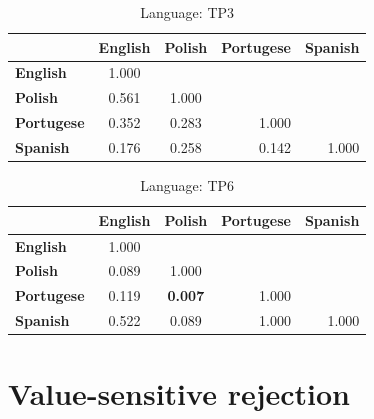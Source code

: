 \begin{table}
    \small
    \centering
    \begin{tabular}{lcccc}
        \toprule
                           & \multicolumn{1}{l}{\textbf{English}} & \multicolumn{1}{l}{\textbf{Polish}} & \textbf{Portugese}        & \textbf{Spanish}          \\
        \midrule
        \textbf{English}   & 1.000                                & \multicolumn{1}{l}{}                &                           &                           \\
        \textbf{Polish}    & 0.561                                & 1.000                               &                           &                           \\
        \textbf{Portugese} & 0.352                                & 0.283                               & \multicolumn{1}{r}{1.000} &                           \\
        \textbf{Spanish}   & 0.176                                & 0.258                               & \multicolumn{1}{r}{0.142} & \multicolumn{1}{r}{1.000} \\
        \bottomrule
    \end{tabular}
    \caption{Language: TP3}
\end{table}

\begin{table}
    \small
    \centering
    \begin{tabular}{lcccc}
        \toprule
                           & \multicolumn{1}{l}{\textbf{English}} & \multicolumn{1}{l}{\textbf{Polish}}    & \textbf{Portugese}        & \textbf{Spanish}          \\
        \midrule
        \textbf{English}   & 1.000                                & \multicolumn{1}{l}{}                   &                           &                           \\
        \textbf{Polish}    & 0.089                                & 1.000                                  &                           &                           \\
        \textbf{Portugese} & 0.119                                & \cellcolor[HTML]{EFEFEF}\textbf{0.007} & \multicolumn{1}{r}{1.000} &                           \\
        \textbf{Spanish}   & 0.522                                & 0.089                                  & \multicolumn{1}{r}{1.000} & \multicolumn{1}{r}{1.000} \\
        \bottomrule
    \end{tabular}
    \caption{Language: TP6}
\end{table}

\section{Value-sensitive rejection}
\label{sec:results-rejector}
